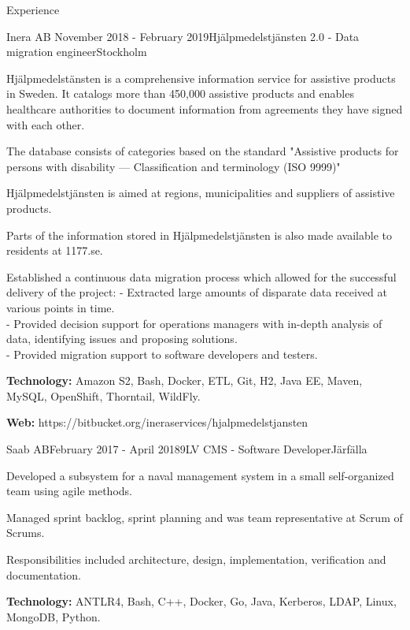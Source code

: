 \documentclass{resume}
\begin{document}
\begin{rSection}{Experience}
    \begin{rSubsection}{Inera AB }{November 2018 - February 2019}{Hjälpmedelstjänsten 2.0 - Data migration engineer}{Stockholm}
      \item Hjälpmedelstänsten is a comprehensive information service for assistive products in Sweden.
      It catalogs more than 450,000 assistive products and enables healthcare authorities to document
      information from agreements they have signed with each other.
      \item The database consists of categories based on the standard "Assistive products for persons with disability — Classification and terminology (ISO 9999)"
      \item Hjälpmedelstjänsten is aimed at regions, municipalities and suppliers of assistive products.
      \item Parts of the information stored in Hjälpmedelstjänsten is also made available to residents at 1177.se.
      \item Established a continuous data migration process which allowed for the successful delivery of the project:
       - Extracted large amounts of disparate data received at various points in time. \\
       - Provided decision support for operations managers with in-depth analysis of data, identifying issues and proposing solutions. \\
       - Provided migration support to software developers and testers.
      \item \textbf{Technology:} Amazon S2, Bash, Docker, ETL, Git, H2, Java EE, Maven, MySQL, OpenShift, Thorntail, WildFly.
      \item \textbf{Web:} https://bitbucket.org/ineraservices/hjalpmedelstjansten
    \end{rSubsection}

    \newpage
    \begin{rSubsection}{Saab AB}{February 2017 - April 2018}{9LV CMS - Software Developer}{Järfälla}
      \item Developed a subsystem for a naval management system in a small self-organized team using agile methods.
      \item Managed sprint backlog, sprint planning and was team representative at Scrum of Scrums.
      \item Responsibilities included architecture, design, implementation, verification and documentation.
      \item \textbf{Technology:}  ANTLR4, Bash, C++, Docker, Go, Java, Kerberos, LDAP, Linux, MongoDB, Python.
    \end{rSubsection}


\end{rSection}
\end{document}
